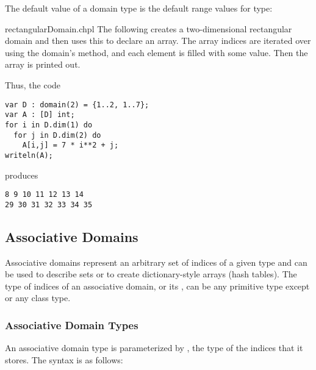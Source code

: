 
The default value of a domain type is the  default range
values for type:
\begin{quote}
\end{quote}

\begin{chapelexample}{rectangularDomain.chpl}
The following creates a two-dimensional rectangular domain and then uses this to
declare an array.  The array indices are iterated over using the domain's
 method, and each element is filled with
some value.  Then the array is printed out.

Thus, the code
\begin{chapel}
\begin{verbatim}
var D : domain(2) = {1..2, 1..7};
var A : [D] int;
for i in D.dim(1) do
  for j in D.dim(2) do
    A[i,j] = 7 * i**2 + j;
writeln(A);
\end{verbatim}
\end{chapel}
produces
\begin{chapelprintoutput}
\begin{verbatim}
8 9 10 11 12 13 14
29 30 31 32 33 34 35
\end{verbatim}
\end{chapelprintoutput}
\end{chapelexample}

\subsection{Associative Domains}

Associative domains represent an arbitrary set of indices
of a given type and can be used to describe sets or to create
dictionary-style arrays (hash tables).
The type of indices of an associative domain, or its ,
can be any primitive type except  or any class type.

\subsubsection{Associative Domain Types}

\label{Associative_Domain_Types}

An associative domain type is parameterized by , the
type of the indices that it stores.  The syntax is as follows:

